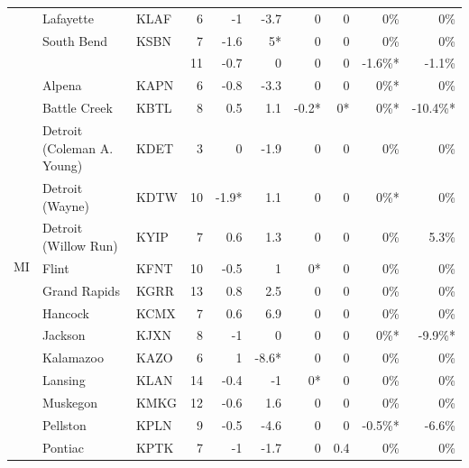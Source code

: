 \documentclass[twocol]{ametsoc}
\begin{document}
\begin{landscape}
\begin{table}[]
\begin{tabular}{@{}cllrrrrrrr@{}}
                     & Lafayette                  & KLAF & 6    & -1    & -3.7  & 0     & 0    & 0\%     & 0\%      \\
                     & South Bend                 & KSBN & 7    & -1.6  & 5*    & 0     & 0    & 0\%     & 0\%      \\ \cmidrule(l){2-10} 
                     &                            &      & 11   & -0.7  & 0     & 0     & 0    & -1.6\%* & -1.1\%   \\ \midrule
\multirow{17}{*}{MI} & Alpena                     & KAPN & 6    & -0.8  & -3.3  & 0     & 0    & 0\%*    & 0\%      \\
                     & Battle Creek               & KBTL & 8    & 0.5   & 1.1   & -0.2* & 0*   & 0\%*    & -10.4\%* \\
                     & Detroit (Coleman A. Young) & KDET & 3    & 0     & -1.9  & 0     & 0    & 0\%     & 0\%      \\
                     & Detroit (Wayne)            & KDTW & 10   & -1.9* & 1.1   & 0     & 0    & 0\%*    & 0\%      \\
                     & Detroit (Willow Run)       & KYIP & 7    & 0.6   & 1.3   & 0     & 0    & 0\%     & 5.3\%    \\
                     & Flint                      & KFNT & 10   & -0.5  & 1     & 0*    & 0    & 0\%     & 0\%      \\
                     & Grand Rapids               & KGRR & 13   & 0.8   & 2.5   & 0     & 0    & 0\%     & 0\%      \\
                     & Hancock                    & KCMX & 7    & 0.6   & 6.9   & 0     & 0    & 0\%     & 0\%      \\
                     & Jackson                    & KJXN & 8    & -1    & 0     & 0     & 0    & 0\%*    & -9.9\%*  \\
                     & Kalamazoo                  & KAZO & 6    & 1     & -8.6* & 0     & 0    & 0\%     & 0\%      \\
                     & Lansing                    & KLAN & 14   & -0.4  & -1    & 0*    & 0    & 0\%     & 0\%      \\
                     & Muskegon                   & KMKG & 12   & -0.6  & 1.6   & 0     & 0    & 0\%     & 0\%      \\
                     & Pellston                   & KPLN & 9    & -0.5  & -4.6  & 0     & 0    & -0.5\%* & -6.6\%   \\
                     & Pontiac                    & KPTK & 7    & -1    & -1.7  & 0     & 0.4  & 0\%     & 0\%      \\

\end{tabular}
\end{table}
\end{landscape}
\end{document}
